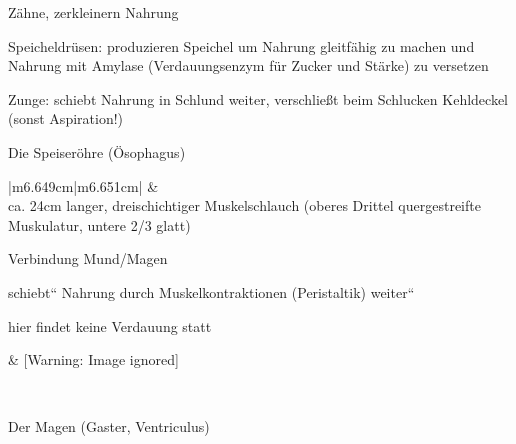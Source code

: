 \documentclass{article}
\begin{document}
Z\"ahne, zerkleinern Nahrung

Speicheldr\"usen: produzieren Speichel um Nahrung gleitf\"ahig zu machen
und Nahrung mit Amylase (Verdauungsenzym f\"ur Zucker und St\"arke) zu
versetzen

Zunge: schiebt Nahrung in Schlund weiter, verschlie{\ss}t beim Schlucken
Kehldeckel (sonst  Aspiration!)

Die Speiser\"ohre (\"Osophagus)

\begin{center}
\tablehead{}\begin{supertabular}{|m{6.649cm}|m{6.651cm}|}
\hline
 &
\\\hline
ca. 24cm langer, dreischichtiger Muskelschlauch (oberes Drittel
quergestreifte Muskulatur, untere 2/3 glatt) 

Verbindung Mund/Magen

{\quotedblbase}schiebt{\textquotedblleft} Nahrung durch
Muskelkontraktionen (Peristaltik)
{\quotedblbase}weiter{\textquotedblleft}

hier findet keine Verdauung statt

 &
    [Warning: Image ignored] %
 \par

\\\hline
\end{supertabular}
\end{center}
Der Magen (Gaster, Ventriculus)
\end{document}
